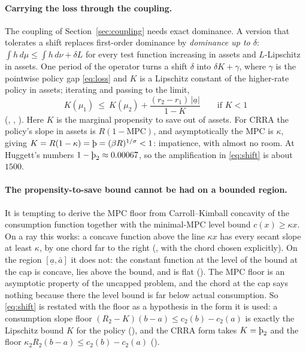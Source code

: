 \paragraph{Carrying the loss through the coupling.}
The coupling of Section~\ref{sec:coupling} needs exact dominance. A version that tolerates a shift
replaces first-order dominance by \emph{dominance up to $\delta$}: $\int h\,d\mu\le\int h\,d\nu+\delta L$
for every test function increasing in assets and $L$-Lipschitz in assets. One period of the
operator turns a shift $\delta$ into $\delta K+\gamma$, where $\gamma$ is the pointwise policy gap
\eqref{eq:loss} and $K$ is a Lipschitz constant of the higher-rate policy in assets; iterating and
passing to the limit,
\begin{equation}\label{eq:shift}
  K(\mu_1)\ \le\ K(\mu_2)+\frac{(r_2-r_1)\,|\underline a|}{1-K}\qquad\text{if }K<1
\end{equation}
(, ,
). Here $K$ is the marginal propensity to save out of
assets. For CRRA the policy's slope in assets is $R(1-\mathrm{MPC})$, and asymptotically the MPC is
$\kappa$, giving $K=R(1-\kappa)=\Thorn=(\beta R)^{1/\sigma}<1$: impatience, with almost no room. At
Huggett's numbers $1-\Thorn_2\approx0.00067$, so the amplification in \eqref{eq:shift} is about
$1500$.

\paragraph{The propensity-to-save bound cannot be had on a bounded region.}
It is tempting to derive the MPC floor from Carroll--Kimball concavity of the consumption function
together with the minimal-MPC level bound $c(x)\ge\kappa x$. On a ray this works: a concave function
above the line $\kappa x$ has every secant slope at least $\kappa$, by one chord far to the right
(, with the chord chosen explicitly). On the region
$[\underline a,\bar a]$ it does not: the constant function at the level of the bound at the cap is
concave, lies above the bound, and is flat (). The MPC floor is an
asymptotic property of the uncapped problem, and the chord at the cap says nothing because there
the level bound is far below actual consumption. So \eqref{eq:shift} is restated with the floor as a
hypothesis in the form it is used: a consumption slope floor $(R_2-K)(b-a)\le c_2(b)-c_2(a)$ is
exactly the Lipschitz bound $K$ for the policy (),
and the CRRA form takes $K=\Thorn_2$ and the floor $\kappa_2R_2(b-a)\le c_2(b)-c_2(a)$
().


